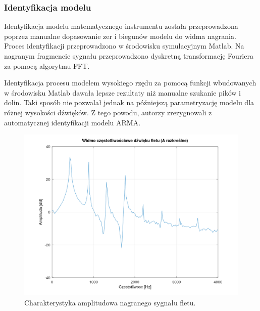 \subsubsection{Identyfikacja modelu}
Identyfikacja modelu matematycznego instrumentu została przeprowadzona poprzez manualne dopasowanie zer i biegunów modelu do widma nagrania.
Proces identyfikacji przeprowadzono w środowisku symulacyjnym Matlab. Na nagranym fragmencie sygnału przeprowadzono dyskretną transformację Fouriera za pomocą algorytmu FFT.

Identyfikacja procesu modelem wysokiego rzędu za pomocą funkcji wbudowanych w środowisku Matlab dawała lepsze rezultaty niż manualne szukanie pików i dolin. Taki sposób nie pozwalał jednak na późniejszą parametryzację modelu dla różnej wysokości dźwięków. Z tego powodu, autorzy zrezygnowali z automatycznej identyfikacji modelu ARMA.

\begin{figure}[H]
	\centering
	\includegraphics[width=12cm]{grafiki/flute_spectrum_orig}
	\captionsetup{justification=centering}
	\caption{Charakterystyka amplitudowa nagranego sygnału fletu.}
	\label{rys:flute_spectrum}
\end{figure}

